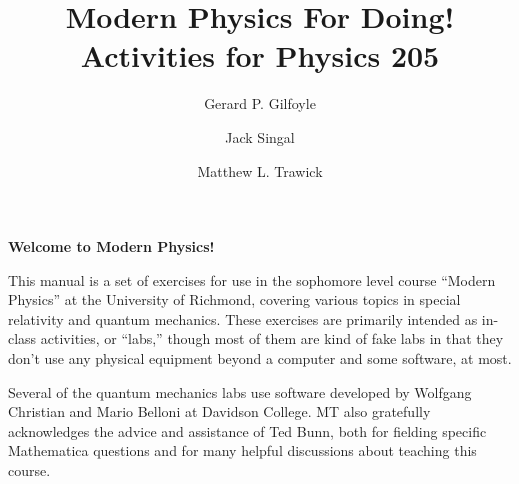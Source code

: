

\title{Modern Physics For Doing!\\
Activities for Physics 205}

\author{Gerard P. Gilfoyle}
\author{Jack Singal}
\author{Matthew L. Trawick}

\maketitle

\vspace{0.8 in}


\begin{center}
\large{\textbf{Welcome to Modern Physics!}}
\end{center}


This manual is a set of exercises for use in the sophomore level course ``Modern Physics'' at the University of Richmond, covering various topics in special relativity and quantum mechanics.  These exercises are primarily intended as in-class activities, or ``labs,'' though most of them are kind of fake labs in that they don't use any physical equipment beyond a computer and some software, at most.

Several of the quantum mechanics labs use software developed by Wolfgang Christian and Mario Belloni at Davidson College.  MT also gratefully acknowledges the advice and assistance of Ted Bunn, both for fielding specific Mathematica questions and for many helpful discussions about teaching this course.



\newpage
\
\thispagestyle{plain}

\newpage
\
